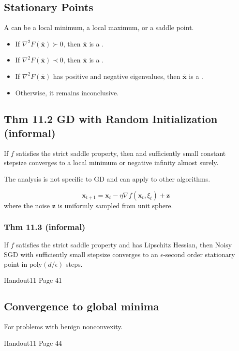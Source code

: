\subsection*{Stationary Points}
A  can be a local minimum, a local maximum, or a saddle point.
\begin{itemize}[leftmargin=*]
    \item If $\nabla^{2} F(\overline{\mathbf{x}}) \succ 0$, then $\overline{\mathbf{x}}$ is a .
    \item If $\nabla^{2} F(\overline{\mathbf{x}}) \prec 0$, then $\overline{\mathbf{x}}$ is a .
    \item If $\nabla^{2} F(\overline{\mathbf{x}})$ has positive and negative eigenvalues, then $\overline{\mathbf{x}}$ is a .
    \item Otherwise, it remains inconclusive.
\end{itemize}





\subsection*{Thm 11.2 GD with Random Initialization (informal)}
If $f$ satisfies the strict saddle property, then  and sufficiently small constant stepsize converges to a local minimum or negative infinity almost surely.

The analysis is not specific to GD and can apply to other algorithms.






$$
\mathbf{x}_{t+1}=\mathbf{x}_{t}-\eta \nabla f\left(\mathbf{x}_{t}, \xi_{t}\right)+\mathbf{z}
$$
where the noise $\mathbf{z}$ is uniformly sampled from unit sphere.

\subsubsection*{Thm 11.3 (informal)}
If $f$ satisfies the strict saddle property and has Lipschitz Hessian, then Noisy SGD with sufficiently small stepsize converges to an $\epsilon$-second order stationary point in  $\text{poly}(d / \epsilon)$ steps.

Handout11 Page 41









\subsection*{Convergence to global minima}
For problems with benign nonconvexity.

Handout11 Page 44